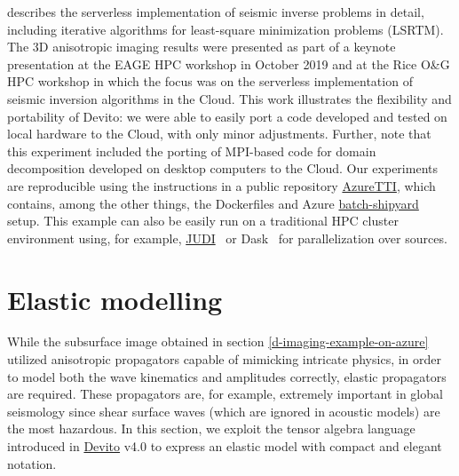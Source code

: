\documentclass[10pt, conference]{IEEEtran}
\newcommand{\devito}{\href{https://github.com/devitocodes/devito}{Devito} }
\begin{document}
\cite{witte2019TPDedas} describes the serverless implementation of seismic
inverse problems in detail, including iterative algorithms for least-square
minimization problems (LSRTM). The 3D anisotropic imaging results were presented
as part of a keynote presentation at the EAGE HPC workshop in October 2019
\cite{herrmann2019EAGEHPCaii} and at the Rice O\&G HPC workshop
\cite{witte2019RHPCssi} in which the focus was on the serverless implementation
of seismic inversion algorithms in the Cloud. This work illustrates the
flexibility and portability of Devito: we were able to easily port a code
developed and tested on local hardware to the Cloud, with only minor
adjustments. Further, note that this experiment included the porting of
MPI-based code for domain decomposition developed on desktop computers to the
Cloud. Our experiments are reproducible using the instructions in a public
repository \href{https://github.com/slimgroup/Azure2019/tree/v1.0}{AzureTTI}, which
contains, among the other things, the Dockerfiles and Azure
\href{https://batch-shipyard.readthedocs.io}{batch-shipyard} setup. This example
can also be easily run on a traditional HPC cluster environment using, for example, 
\href{https://github.com/slimgroup/JUDI.jl}{JUDI}~\cite{witte2018alf} or Dask~\cite{dask}
for parallelization over sources.

\section{Elastic modelling}\label{elastic-modelling}

While the subsurface image obtained in section \ref{d-imaging-example-on-azure}
utilized anisotropic propagators capable of mimicking intricate physics, in order
to model both the wave kinematics and amplitudes correctly, elastic
propagators are required. These propagators are, for example, extremely
important in global seismology since shear surface waves (which are
ignored in acoustic models) are the most hazardous. In this section, we
exploit the tensor algebra language introduced in \devito v4.0 to express
an elastic model with compact and elegant notation.
\end{document}
